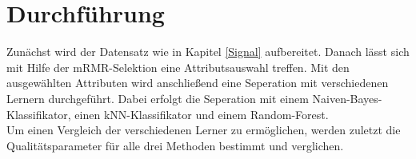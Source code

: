 \section{Durchführung}
Zunächst wird der Datensatz wie in Kapitel \ref{Signal} aufbereitet. Danach lässt sich mit Hilfe der mRMR-Selektion eine Attributsauswahl treffen. Mit den ausgewählten Attributen wird anschließend eine Seperation mit verschiedenen Lernern durchgeführt. Dabei erfolgt die Seperation mit einem Naiven-Bayes-Klassifikator, einen kNN-Klassifikator und einem Random-Forest. \\
Um einen Vergleich der verschiedenen Lerner zu ermöglichen, werden zuletzt die Qualitätsparameter für alle drei Methoden bestimmt und verglichen.
